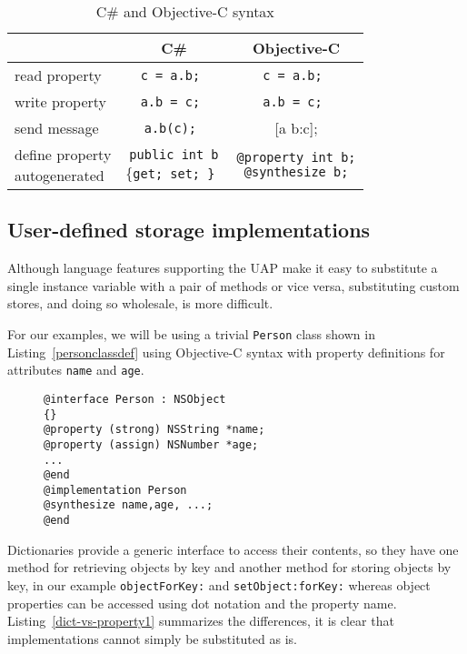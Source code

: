 \documentclass[preprint]{sigplanconf}
\begin{document}
\begin{table}
\center
\begin{tabular}{|l|c|c|} \hline
   & C\#  	 & Objective-C  		 \\\hline 
read property & {\tt c = a.b; }	 & {\tt c = a.b;  }		 \\\hline 
write property & {\tt a.b = c; }	 & {\tt a.b = c; }		 \\\hline 
send message & {\tt a.b(c);  }	 & { [a b:c]; }		 \\\hline 
\shortstack{{define property}\\{autogenerated}}  & \shortstack{ {\tt public int b} \\ { \{\tt get; set; \} }}  & \shortstack{{\tt @property int b;}\\{\tt @synthesize b;}}\\\hline 

\end{tabular}
\caption{C\# and Objective-C syntax}
\label{objc-syntax}
\end{table}



\subsection{User-defined storage implementations}
\label{userdefined}
Although language features supporting the UAP make it easy to substitute a single 
instance variable with a pair of methods or vice versa, substituting custom stores,
and doing so wholesale, is more difficult.

For our examples, we will be using a trivial {\tt Person} class shown in Listing~\ref{personclassdef}
using Objective-C syntax with property definitions for attributes {\tt name} and {\tt age}.

\begin{figure}[htbp]
\begin{lstlisting}[style=numbers,label=personclassdef,caption=Person class.]
@interface Person : NSObject 
{}
@property (strong) NSString *name;
@property (assign) NSNumber *age;
...
@end
@implementation Person
@synthesize name,age, ...;
@end
\end{lstlisting}
\end{figure}


Dictionaries provide a generic interface to access their contents, so they have
one method for retrieving objects by key and another method for storing objects
by key, in our example {\tt objectForKey:} and {\tt setObject:forKey:} whereas
object properties can be accessed using dot notation and the property name.
Listing~\ref{dict-vs-property1} summarizes the differences, it is clear that implementations
cannot simply be substituted as is.
\end{document}
